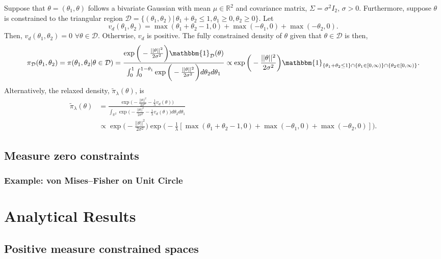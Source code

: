 \documentclass[10pt,fleqn]{article}
\DeclareMathOperator{\1}{\mathbbm{1}}
\begin{document}
{Suppose that $\theta = (\theta_1,\theta)$ follows a bivariate Gaussian with mean $\mu \in\mathbb{R}^2$ and covariance matrix, $\Sigma = \sigma^2 I_2$, $\sigma > 0$. Furthermore, suppose $\theta$ is constrained to the triangular region $\mathcal{D} = \{(\theta_1,\theta_2) | \, \theta_1+\theta_2\le 1, \theta_1\ge0, \theta_2 \ge 0\}.$ Let $$v_d(\theta_1,\theta_2) = \max(\theta_1+\theta_2 -1,0) + \max(-\theta_1,0) + \max(-\theta_2,0).$$
Then, $v_d(\theta_1,\theta_2) = 0$ $\forall \theta\in\mathcal{D}$. Otherwise, $v_d$ is positive.  The fully constrained density of $\theta$ given that $\theta\in \mathcal{D}$ is then,
$$\pi_\mathcal{D}(\theta_1,\theta_2)= \pi(\theta_1,\theta_2|\theta\in\mathcal{D})= \frac{\exp\bigg(-\frac{||\theta||^2}{2\sigma^2}\bigg)\mathbbm{1}_\mathcal{D}(\theta)}{\int_0^1\int_0^{1-\theta_1}\exp\bigg(-\frac{||\theta||^2}{2\sigma^2}\bigg)d\theta_2d\theta_1}\propto \exp\bigg(-\frac{||\theta||^2}{2\sigma^2}\bigg) \mathbbm{1}_{\{\theta_1+\theta_2\le 1\}\cap \{\theta_1 \in [0,\infty)\}\cap \{\theta_2\in[0,\infty)\}} .$$
Alternatively, the relaxed density, $\tilde{\pi}_\lambda(\theta)$, is
\begin{align*}
\tilde{\pi}_\lambda(\theta) &=\frac{\exp\bigg(-\frac{||\theta||^2}{2\sigma^2} - \frac{1}{\lambda}v_d(\theta) \bigg)}{\int_{\mathbb{R}^2} \exp\bigg(-\frac{||\theta||^2}{2\sigma^2}-\frac{1}{\lambda}v_d(\theta) \bigg)d\theta_2d\theta_1}\\
& \propto \exp\bigg(-\frac{||\theta||^2}{2\sigma^2}\bigg)\exp\bigg( - \frac{1}{\lambda}[\max(\theta_1+\theta_2 -1,0) + \max(-\theta_1,0) + \max(-\theta_2,0)] \bigg).
\end{align*}
\subsection{Measure zero constraints}
\label{SEC:Zero_Measure_Methods}


\subsubsection{Example: von Mises--Fisher on Unit Circle}


\section{Analytical Results}
\subsection{Positive measure constrained spaces}
\label{SEC:Positive_measure_theory}

}
\end{document}
